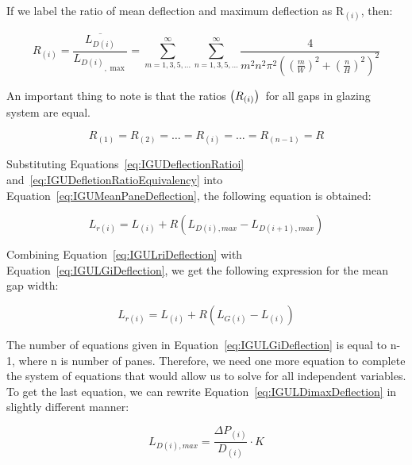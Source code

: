 If we label the ratio of mean deflection and maximum deflection as R\(_{(i)}\), then:

\begin{equation}
{R_{(i)}} = \frac{{\overline {{L_{D(i)}}} }}{{{L_{D(i)}}_{,\max }}} = \sum\limits_{m = 1,3,5,...}^\infty  {\sum\limits_{n = 1,3,5,...}^\infty  {\frac{4}{{{m^2}{n^2}{\pi ^2}{{\left( {{{(\frac{m}{W})}^2} + {{(\frac{n}{H})}^2}} \right)}^2}}}} }
\label{eq:IGUDeflectionRatioi}
\end{equation}

An important thing to note is that the ratios $\left(R_{\left(i\right)}\right)$\ for all gaps in glazing system are equal.

\begin{equation}
{R_{\left( 1 \right)}} = {R_{\left( 2 \right)}} =  \ldots  = {R_{\left( i \right)}} =  \ldots  = {R_{\left( {n - 1} \right)}} = {R}
\label{eq:IGUDefletionRatioEquivalency}
\end{equation}

Substituting Equations~\ref{eq:IGUDeflectionRatioi} and~\ref{eq:IGUDefletionRatioEquivalency} into Equation~\ref{eq:IGUMeanPaneDeflection}, the following equation is obtained:

\begin{equation}
{L_{r\left( i \right)}} = {L_{\left( i \right)}} + R\left( {{L_{D\left( i \right),max}} - {L_{D\left( {i + 1} \right),max}}} \right)
\label{eq:IGULriDeflection}
\end{equation}

Combining Equation~\ref{eq:IGULriDeflection} with Equation~\ref{eq:IGULGiDeflection}, we get the following expression for the mean gap width:

\begin{equation}
{L_{r\left( i \right)}} = {L_{\left( i \right)}} + R\left( {{L_{G\left( i \right)}} - {L_{\left( i \right)}}} \right)
\end{equation}

The number of equations given in Equation~\ref{eq:IGULGiDeflection} is equal to n-1, where n is number of panes. Therefore, we need one more equation to complete the system of equations that would allow us to solve for all independent variables. To get the last equation, we can rewrite Equation~\ref{eq:IGULDimaxDeflection} in slightly different manner:

\begin{equation}
{L_{D\left( i \right),max}} = \frac{{\Delta {P_{\left( i \right)}}}}{{{D_{\left( i \right)}}}}\cdot K
\end{equation}


